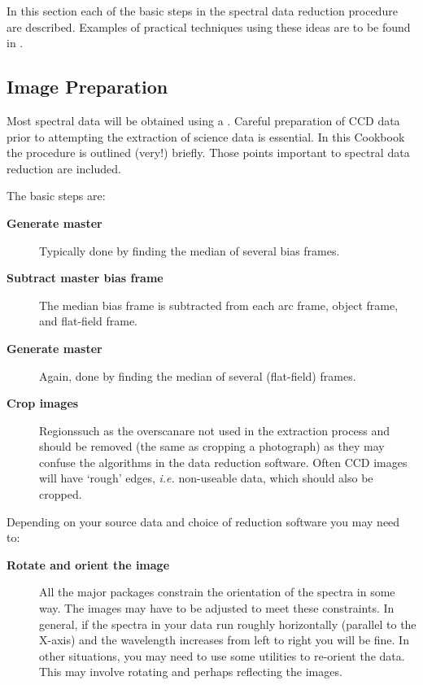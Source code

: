 In this section each of the basic steps in the spectral data reduction
procedure are described.
Examples of practical techniques using these ideas are to be found
in \scspec{\S\ref{simple_worked_example}}
{}.


\subsection{Image Preparation}

Most spectral data will be obtained using a .
Careful preparation of CCD data prior to attempting the extraction of
science data is essential.
In this Cookbook the procedure is outlined (very!) briefly.
Those points important to spectral data reduction are included.

The basic steps are:

\begin{description}

\item [{\bf Generate master }]
      Typically done by finding the median of several bias frames.

\item [{\bf Subtract master bias frame}]
      The median bias frame is subtracted from each arc frame,
      object frame, and flat-field frame.

\item [{\bf Generate master }]
      Again, done by finding the median of several (flat-field) frames.

\item [{\bf Crop images}]
      Regions\scspec{---}{ - }such as the overscan\scspec{---}{ - }are
      not used in the extraction process and should be removed (the same
      as cropping a photograph) as they may confuse the algorithms in
      the data reduction software.
      Often CCD images will have `rough' edges, {\em i.e.} non-useable
      data, which should also be cropped.

\end{description}

Depending on your source data and choice of reduction software you may
need to:

\begin{description}

\item [{\bf Rotate and orient the image}]
      All the major packages constrain the orientation of the spectra
      in some way.
      The images may have to be adjusted to meet these constraints.
      In general, if the spectra in your data run roughly
      horizontally (parallel to the X-axis) and the wavelength increases
      from left to right you will be fine.
      In other situations, you may need to use some utilities to
      re-orient the data.
      This may involve rotating and perhaps reflecting the images.

\end{description}

